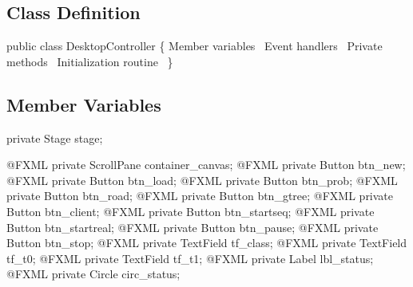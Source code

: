 \documentclass{article}
\def\nwendcode{\endtrivlist \endgroup}      %
\let\nwdocspar=\par
\begin{document}
\subsection{Class Definition}
\nwenddocs{}\endmoddef{}
public class DesktopController \{
  \LA{}Member variables~{\nwtagstyle{}}\RA{}
  \LA{}Event handlers~{\nwtagstyle{}}\RA{}
  \LA{}Private methods~{\nwtagstyle{}}\RA{}
  \LA{}Initialization routine~{\nwtagstyle{}}\RA{}
\}
\nwendcode{}\nwdocspar

\subsection{Member Variables}
\nwenddocs{}\endmoddef{}
private Stage stage;
\eatline
{}\nwendcode{}\nwdocspar
\nwenddocs{}\plusendmoddef
@FXML private ScrollPane container_canvas;
@FXML private Button btn_new;
@FXML private Button btn_load;
@FXML private Button btn_prob;
@FXML private Button btn_road;
@FXML private Button btn_gtree;
@FXML private Button btn_client;
@FXML private Button btn_startseq;
@FXML private Button btn_startreal;
@FXML private Button btn_pause;
@FXML private Button btn_stop;
@FXML private TextField tf_class;
@FXML private TextField tf_t0;
@FXML private TextField tf_t1;
@FXML private Label lbl_status;
@FXML private Circle circ_status;
\nwendcode{}\nwdocspar
\end{document}
